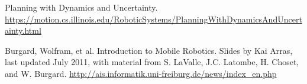 \documentclass[12pt]{article}
\begin{document}
\begin{thebibliography}{}
\raggedright

Planning with Dynamics and Uncertainty. \href{https://motion.cs.illinois.edu/RoboticSystems/PlanningWithDynamicsAndUncertainty.html}
{https://motion.cs.illinois.edu/RoboticSystems/PlanningWithDynamicsAndUncertainty.html}

Burgard, Wolfram, et al. Introduction to Mobile Robotics. Slides by Kai Arras, last updated July 2011, with material from S. LaValle, J.C. Latombe, H. Choset, and W. Burgard. \href{http://ais.informatik.uni-freiburg.de/news/index_en.php}{http://ais.informatik.uni-freiburg.de/news/index\_en.php}


\end{thebibliography}
\end{document}

